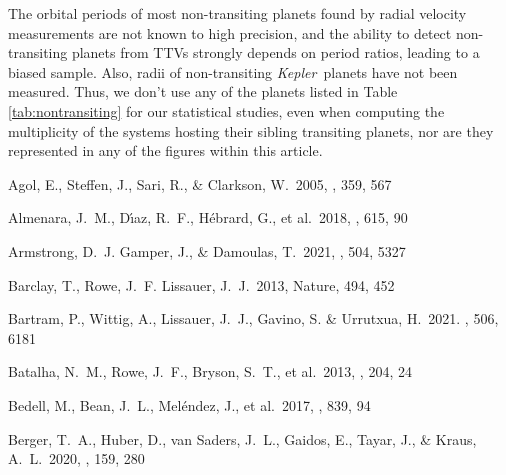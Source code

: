 \documentclass{aastex62}
\newcommand{\ik}{{\it Kepler~}}
\begin{document}
The orbital periods of most non-transiting planets found by radial velocity measurements are not known to high precision, and the ability to detect non-transiting planets from TTVs strongly depends on period ratios, leading to a biased sample. Also, radii of non-transiting \ik planets have not been measured. Thus, we don't  use any of the planets listed in Table \ref{tab:nontransiting} %
for our statistical studies, even when computing the multiplicity of the systems hosting their sibling transiting planets, nor are they represented in any of the figures within this article.




\begin{thebibliography}{}

 Agol, E., Steffen, J.,  Sari, R., \&  Clarkson, W.\ 2005, \mnras, 359, 567

Almenara, J.~M.,  D{\'\i}az, R.~F.,  H{\'e}brard, G., et al.\ 2018, \aap, 615, 90

 Armstrong, D.~J. Gamper, J., \& Damoulas, T.\ 2021, \mnras, 504, 5327

 Barclay, T., Rowe, J.~F. Lissauer, J.~J.\ 2013, Nature, 494, 452

 Bartram, P., Wittig, A., Lissauer, J.~J., Gavino, S. \& Urrutxua, H.~2021.   \mnras, 506, 6181


 Batalha, N.~M., Rowe, J.~F.,  Bryson, S.~T., et al.\ 2013, \apjs, 204, 24 



 Bedell, M., Bean, J.~L., Mel{\'e}ndez, J., et al.~2017, \apj, 839, 94

 Berger, T.~A., Huber, D., van Saders, J.~L., Gaidos, E., Tayar, J., \& Kraus, A.~L.~2020, \aj, 159, 280


\end{thebibliography}
\end{document}
